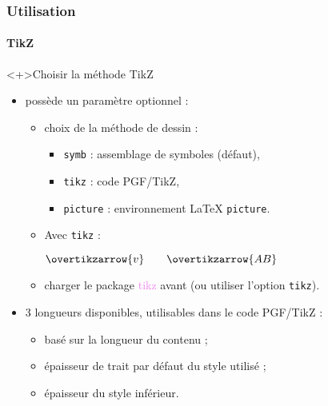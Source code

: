 \documentclass[10pt, aspectratio=3218]{beamer}
\newcommand*{\pkg}[1]{\textcolor{violet}{\textsf{#1}}}
\newcommand*{\opt}[1]{\textcolor{Definition}{\texttt{\small #1}}}
\newcommand{\rmq}[1]{{\small #1}}
\begin{document}
\begin{frame}[fragile]

\frametitle{Utilisation}
\framesubtitle{TikZ}

\begin{block}<+>{Choisir la méthode TikZ}
\begin{itemize}
 \item {} possède un paramètre optionnel :
  \begin{itemize}
   \item choix de la méthode de dessin :
    \begin{itemize}
     \item \texttt{symb} : assemblage de symboles (défaut),
     \item \texttt{\texttt{tikz}} : code PGF/TikZ,
     \item \texttt{picture} : environnement \LaTeX{} \texttt{picture}.
    \end{itemize}

   \item Avec \texttt{\texttt{tikz}} :
   \undef\overtikzarrow%
  \begin{dispExample}
$ \overtikzarrow{v} \qquad \overtikzarrow{AB} $
 \end{dispExample}
\smallskip
\item charger le package \pkg{tikz} avant (ou utiliser l'option \opt{tikz}).
  \end{itemize}
 \item 3 longueurs disponibles, utilisables dans le code PGF/TikZ :
\begin{itemize}
 \item {} \rmq{basé sur la longueur du
   contenu} ;
 \item {} \rmq{épaisseur de trait par défaut
   du style utilisé} ;
 \item {} \rmq{épaisseur du style
   inférieur}.
\end{itemize}

\end{itemize}
\end{block}

\end{frame}
\end{document}
